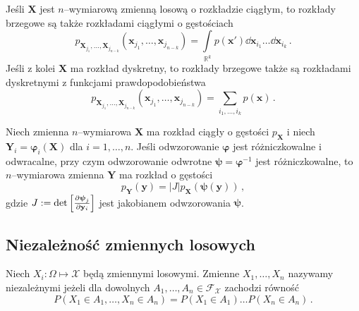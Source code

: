 \documentclass{myclass}
\numberwithin{equation}{subsection}
\begin{document}
Jeśli \(\mathbf{X}\) jest \(n\)--wymiarową zmienną losową o rozkładzie ciągłym, to rozkłady brzegowe
są także rozkładami ciągłymi o gęstościach
\begin{equation}
    p_{\mathbf{X}_{j_1},\ldots,\mathbf{X}_{j_{n-k}}}(\mathbf{x}_{j_1},\ldots,\mathbf{x}_{j_{n-k}}) = \int\limits_{\mathbb{R}^k} p(\mathbf{x}') \dd{\mathbf{x}_{i_1}}\ldots\dd{\mathbf{x}_{i_k}}\,.
\end{equation}
Jeśli z kolei \(\mathbf{X}\) ma rozkład dyskretny, to rozkłady brzegowe także są rozkładami
dyskretnymi z funkcjami prawdopodobieństwa
\begin{equation}
    p_{\mathbf{X}_{j_1},\ldots,\mathbf{X}_{j_{n-k}}}(\mathbf{x}_{j_1},\ldots,\mathbf{x}_{j_{n-k}}) = \sum_{i_1,\ldots,i_k}p(\mathbf{x})\,.
\end{equation}

\begin{theorem}
Niech zmienna \(n\)--wymiarowa \(\mathbf{X}\) ma rozkład ciągły o gęstości \(p_\mathbf{X}\) i niech
\(\mathbf{Y}_i = \boldsymbol{\varphi}_i(\mathbf{X})\) dla \(i=1,\ldots,n\). Jeśli odwzorowanie
\(\boldsymbol{\varphi}\) jest różniczkowalne i odwracalne, przy czym odwzorowanie odwrotne
\(\boldsymbol{\psi} = \boldsymbol{\varphi}^{-1}\) jest różniczkowalne, to \(n\)--wymiarowa zmienna
\(\mathbf{Y}\) ma rozkład o gęstości
\begin{equation*}
    p_\mathbf{Y}(\mathbf{y}) = |J| p_\mathbf{X}(\boldsymbol{\psi}(\mathbf{y}))\,,
\end{equation*}
gdzie \(J := \det \left[\pdv{\boldsymbol{\psi}_j}{\mathbf{y}_i}\right]\) jest jakobianem
odwzorowania \(\boldsymbol{\psi}\).
\end{theorem}


\subsection{Niezależność zmiennych losowych}

\begin{definition}
Niech \(X_i : \Omega \mapsto \mathcal{X}\) będą zmiennymi losowymi. Zmienne \(X_1,\ldots,X_n\)
nazywamy niezależnymi jeżeli dla dowolnych \(A_1,\ldots,A_n \in \mathcal{F}_\mathcal{X}\) zachodzi
równość
\begin{equation*}
    P(X_1 \in A_1, \ldots, X_n \in A_n) = P(X_1 \in A_1) \ldots P(X_n \in A_n)\,.
\end{equation*}
\end{definition}
\end{document}
